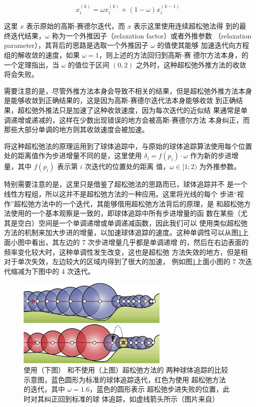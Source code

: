 \begin{equation}
	x^{(k)}_i=\omega{x}^{(k)}_i+(1-\omega)x^{(k-1)}_i
\end{equation}

这里 ${x}$ 表示原始的高斯-赛德尔迭代，而 $x$ 表示这里使用连续超松弛法得 到的最终迭代结果，$\omega$ 称为一个外推因子（relaxation factor）或者外推参数 （relaxation parameter），其背后的思路是选取一个外推因子 $\omega$ 的值使其能够 加速迭代向方程组的解收敛的速度，如果 $\omega = 1$，则上述的方法回归到高斯-赛 德尔方法本身，\cite{a:Gauss-seidelmethodsofsolvinglargesystemsoflinearequations}的一个定理指出，当 $\omega$ 的值位于区间 $(0, 2)$ 之外时，这种超松弛外推方法的收敛将会失败。 

需要注意的是，尽管外推方法本身会导致不相关的结果，但是超松弛外推方法本身是能够收敛到正确结果的，这是因为高斯-赛德尔迭代法本身能够收敛 到正确结果，超松弛外推法只是加速了这种收敛速度，因为每次迭代的近似结 果通常是单调递增或递减的，这样在少数出现错误的地方会被高斯-赛德尔方法 本身纠正，而那些大部分单调的地方则其收敛速度会被加速。

\cite{a:Enhanced-Sphere-Tracing}将这种超松弛法的原理运用到了球体追踪中，与原始的球体追踪算法使用每个位置处的距离值作为步进增量不同的是，这里使用 $\delta_i = f(p_i) \cdot \omega$ 作为新的步进增量，其中 $f(p_i)$ 表示第 $i$ 次迭代的位置处的距离 值，$\omega \in [1; 2)$ 为外推参数。

特别需要注意的是，这里只是借鉴了超松弛法的思路而已，球体追踪并不 是一个线性方程组，所以这并不是超松弛方法的一种应用。这里将光线的每个 步进“视作”超松弛方法中的一个迭代，其能够借用超松弛方法背后的原理，是 和超松弛方法使用的一个基本观察是一致的，即球体追踪中所有步进增量的函 数在某些（尤其是空白）空间是一个单调递增或单调递减函数，因此我们可以 使用类似超松弛方法的机制来加大步进的增量，以加速球体追踪的速度。这种单调性可以从图\ref{f:df-over-relaxation}上面小图中看出，其左边的 7 次步进增量几乎都是单调递增 的，然后在右边表面的频率变化较大时，这种单调性发生改变，这也是超松弛 方法失效的地方，但是相对于单次失效，左边较大的区域内得到了很大的加速， 例如图\ref{f:df-over-relaxation}上面小图的 7 次迭代缩减为下图中的 4 次迭代。

\begin{figure}
\sidecaption
	\includegraphics[width=0.65\textwidth]{figures/df/over-relaxation}
	\caption{使用（下图） 和不使用（上图）超松弛方法的 两种球体追踪的比较示意图，蓝色圆形为标准的球体追踪迭代，红色为使用 超松弛方法的迭代，其中 $\omega = 1.6$，蓝色的圆形表示 超松弛步进失败的位置，此时对其纠正回到标准的球 体追踪，如虚线箭头所示（图片来自\cite{a:Enhanced-Sphere-Tracing}）}
	\label{f:df-over-relaxation}
\end{figure}


